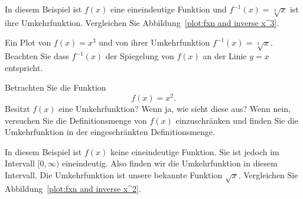 \begin{solution}
In diesem Beispiel ist $f(x)$ eine eineindeutige Funktion und $f^{-1}(x) = \sqrt[3]{x}$ ist ihre Umkehrfunktion. Vergleichen Sie Abbildung~\ref{plot:fxn and inverse x^3}.
\end{solution}

\begin{marginfigure}[-2in]
\caption{
Ein Plot von $f(x)=x^3$ und von ihrer Umkehrfunktion $f^{-1}(x) = \sqrt[3]{x}$. Beachten Sie dass
  $f^{-1}(x)$ der Spiegelung von $f(x)$ an der Linie
  $y=x$ entspricht.}
\label{plot:fxn and inverse x^3}
\end{marginfigure}


\begin{example}
Betrachten Sie die Funktion
\[
f(x) = x^2.
\]
Besitzt $f(x)$ eine Umkehrfunktion? Wenn ja, wie sieht diese aus? Wenn nein, versuchen Sie die Definitionsmenge von $f(x)$ einzuschränken und finden Sie die Umkehrfunktion in der eingeschränkten Definitionsmenge.
\end{example}


\begin{solution}
In diesem Beispiel ist $f(x)$ keine eineindeutige Funktion. Sie ist jedoch im Intervall $[0,\infty)$ eineindeutig. Also finden wir die Umkehrfunktion in diesem Intervall. Die Umkehrfunktion ist unsere bekannte Funktion $\sqrt{x}$.  Vergleichen Sie Abbildung~\ref{plot:fxn and inverse x^2}.
\end{solution}

